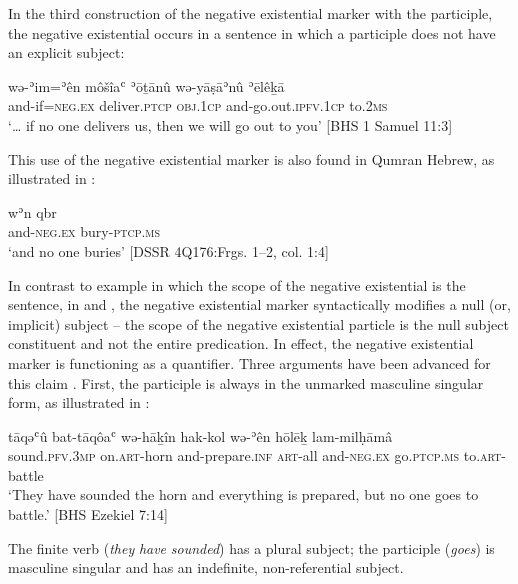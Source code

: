 ﻿\documentclass[output=paper]{langsci/langscibook}
\begin{document}
In the third construction of the negative existential marker with the
participle, the negative existential occurs in a sentence in which a
participle does not have an explicit subject:
%
\begin{exe}\ex \label{ex:heb-deliver}
    \gll wə-ʾim=ʾên môšîaʿ ʾōṯānû wə-yāṣāʾnû ʾēlêḵā          
    \\ and-if=\textsc{neg.ex}   deliver.\textsc{ptcp} \textsc{obj.1cp}
    and-go.out.\textsc{ipfv.1cp}  to.\textsc{2ms}  \\
    \glt `\ldots{} if no one delivers us, then we will go out to you'
    [BHS 1 Samuel 11:3]
    \end{exe}
%
This use of the negative existential marker is also found in Qumran Hebrew,
as illustrated in :
%
\begin{exe}\ex \label{ex:heb-bury}
    \gll wʾn qbr   \\
  and-\textsc{neg.ex}    bury-\textsc{ptcp.ms} \\
    \glt `and no one buries' [DSSR 4Q176:Frgs. 1--2, col.
    1:4]
    \end{exe}

In contrast to example  in which the scope of the
negative existential is the sentence, in  and
, the negative existential marker syntactically modifies a
null (or, implicit) subject -- the scope of the negative existential
particle is the null subject constituent and not the entire predication. In
effect, the negative existential marker is functioning as a quantifier.
Three arguments have been advanced for this claim \parencites(see)()%
{MillerNaude2015}{NaudeMiller2016a}.
First, the participle is always in the unmarked masculine singular form, as
illustrated in :
%
\begin{exe}\ex \label{ex:heb-battle}
    \gll tāqǝʿû bat-tāqôaʿ wǝ-hāḵîn hak-kol  wǝ-ʾên hōlēḵ lam-milḥāmâ \\
sound.\textsc{pfv.3mp} on.\textsc{art}-horn   and-prepare.\textsc{inf}
\textsc{art}-all  and-\textsc{neg.ex}   go.\textsc{ptcp.ms}
to.\textsc{art}-battle \\
    \glt `They have sounded the horn and everything is prepared, but no one
    goes to battle.' [BHS Ezekiel 7:14]
    \end{exe}
%
The finite verb (\textit{they} \textit{have} \textit{sounded}) has a plural subject; the participle (\textit{goes}) is masculine singular and has an indefinite, non-referential subject.
\end{document}
